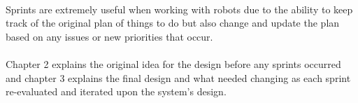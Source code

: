 \paragraph{}
Sprints are extremely useful when working with robots due to the ability to keep track of the original plan of things to do but also change and update the plan based on any issues or new priorities that occur.
\paragraph{}
Chapter 2 explains the original idea for the design before any sprints occurred and chapter 3 explains the final design and what needed changing as each sprint re-evaluated and iterated upon the system's design.
